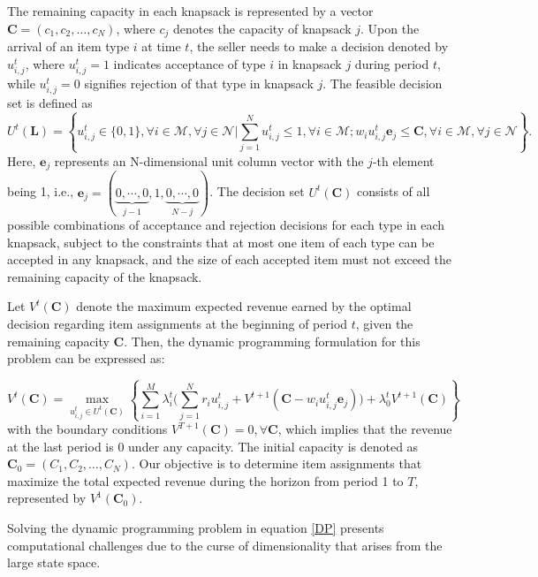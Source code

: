 The remaining capacity in each knapsack is represented by a vector $\mathbf{C} = (c_1, c_2, \ldots, c_N)$, where $c_j$ denotes the capacity of knapsack $j$. Upon the arrival of an item type $i$ at time $t$, the seller needs to make a decision denoted by $u_{i,j}^{t}$, where $u_{i,j}^{t} = 1$ indicates acceptance of type $i$ in knapsack $j$ during period $t$, while $u_{i,j}^{t} = 0$ signifies rejection of that type in knapsack $j$. The feasible decision set is defined as $$U^{t}(\mathbf{L}) = \left\{u_{i,j}^{t} \in \{0,1\}, \forall i \in \mathcal{M}, \forall j \in \mathcal{N} \bigg| \sum_{j=1}^{N} u_{i,j}^{t} \leq 1, \forall i \in \mathcal{M}; w_{i}u_{i,j}^{t}\mathbf{e}_j \leq \mathbf{C}, \forall i \in \mathcal{M}, \forall j \in \mathcal{N}\right\}.$$
Here, $\mathbf{e}_j$ represents an N-dimensional unit column vector with the $j$-th element being 1, i.e., $\mathbf{e}_j = (\underbrace{0, \cdots, 0}_{j-1}, 1, \underbrace{0, \cdots, 0}_{N-j})$. The decision set $U^{t}(\mathbf{C})$ consists of all possible combinations of acceptance and rejection decisions for each type in each knapsack, subject to the constraints that at most one item of each type can be accepted in any knapsack, and the size of each accepted item must not exceed the remaining capacity of the knapsack.

Let $V^{t}(\mathbf{C})$ denote the maximum expected revenue earned by the optimal decision regarding item assignments at the beginning of period $t$, given the remaining capacity $\mathbf{C}$. Then, the dynamic programming formulation for this problem can be expressed as:

\begin{equation}\label{DP}
V^{t}(\mathbf{C}) = \max_{u_{i,j}^{t} \in U^{t}(\mathbf{C})}\left\{\sum_{i=1}^{M} \lambda_i^{t} \bigl( \sum_{j=1}^{N} r_i u_{i,j}^{t} + V^{t+1}(\mathbf{C} - w_i u_{i,j}^{t}\mathbf{e}_j)\bigr) + \lambda_0^{t} V^{t+1}(\mathbf{C})\right\}
\end{equation}
with the boundary conditions $V^{T+1}(\mathbf{C}) = 0, \forall \mathbf{C}$, which implies that the revenue at the last period is 0 under any capacity. The initial capacity is denoted as $\mathbf{C}_{0} = (C_1, C_2, \ldots, C_N)$. Our objective is to determine item assignments that maximize the total expected revenue during the horizon from period 1 to $T$, represented by $V^{1}(\mathbf{C}_{0})$.


Solving the dynamic programming problem in equation \eqref{DP} presents computational challenges due to the curse of dimensionality that arises from the large state space.

